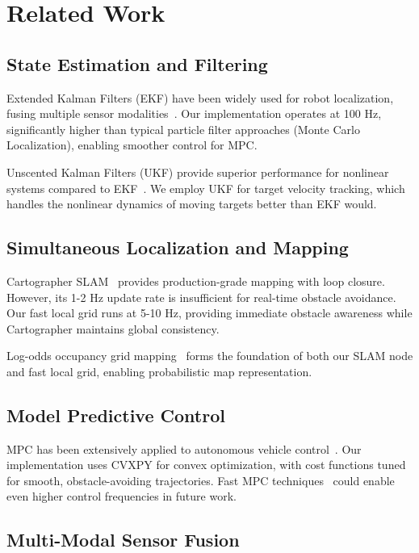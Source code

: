 \documentclass[11pt,a4paper]{article}
\begin{document}
\section{Related Work}

\subsection{State Estimation and Filtering}

Extended Kalman Filters (EKF) have been widely used for robot localization, fusing multiple sensor modalities~\cite{thrun2005probabilistic}. Our implementation operates at 100 Hz, significantly higher than typical particle filter approaches (Monte Carlo Localization), enabling smoother control for MPC.

Unscented Kalman Filters (UKF) provide superior performance for nonlinear systems compared to EKF~\cite{wan2000unscented}. We employ UKF for target velocity tracking, which handles the nonlinear dynamics of moving targets better than EKF would.

\subsection{Simultaneous Localization and Mapping}

Cartographer SLAM~\cite{hess2016realtime} provides production-grade mapping with loop closure. However, its 1-2 Hz update rate is insufficient for real-time obstacle avoidance. Our fast local grid runs at 5-10 Hz, providing immediate obstacle awareness while Cartographer maintains global consistency.

Log-odds occupancy grid mapping~\cite{thrun2005probabilistic} forms the foundation of both our SLAM node and fast local grid, enabling probabilistic map representation.

\subsection{Model Predictive Control}

MPC has been extensively applied to autonomous vehicle control~\cite{boyd2010fast, wang2009model}. Our implementation uses CVXPY for convex optimization, with cost functions tuned for smooth, obstacle-avoiding trajectories. Fast MPC techniques~\cite{boyd2010fast} could enable even higher control frequencies in future work.

\subsection{Multi-Modal Sensor Fusion}
\end{document}
